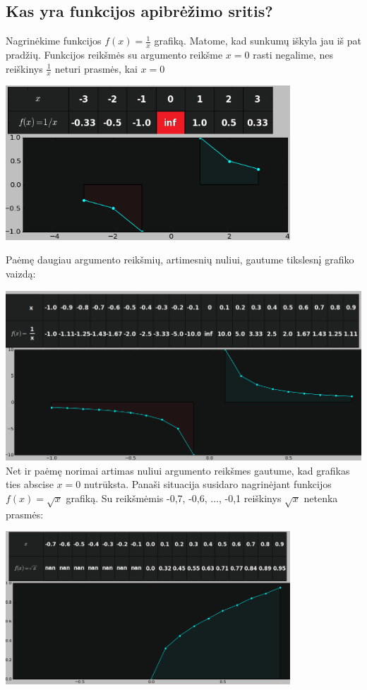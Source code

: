 \documentclass{article}
\begin{document}
\subsection*{Kas yra funkcijos apibrėžimo sritis?}

\begin{minipage}[b]{0.49\textwidth}
Nagrinėkime funkcijos $f(x)=\frac{1}{x}$ grafiką. Matome, kad sunkumų iškyla jau iš pat pradžių. Funkcijos reikšmės su argumento reikšme $x=0$ rasti negalime, nes reiškinys $\frac{1}{x}$ neturi prasmės, kai $x=0$ 
\end{minipage}
\begin{minipage}[m]{0.48\textwidth}
\includegraphics[width=0.8\textwidth]{graphsnip5.png}
\end{minipage}
Paėmę daugiau argumento reikšmių, artimesnių nuliui, gautume tikslesnį grafiko vaizdą:

\includegraphics[width=\textwidth]{graphsnip6.png}
Net ir paėmę norimai artimas nuliui argumento reikšmes gautume, kad grafikas ties abscise $x=0$ nutrūksta.
Panaši situacija susidaro nagrinėjant funkcijos $f(x)=\sqrt{x}$ grafiką. Su reikšmėmis -0,7, -0,6, ..., -0,1 reiškinys $\sqrt{x}$ netenka prasmės:

\includegraphics[width=0.8\textwidth]{graphsnip7.png}
\end{document}
